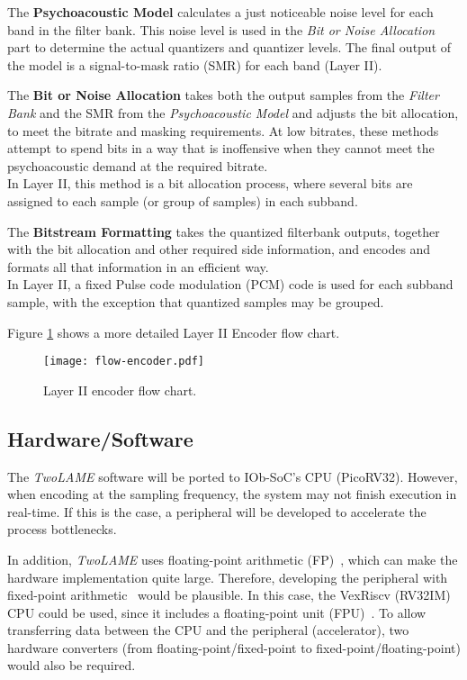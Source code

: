 The \textbf{Psychoacoustic Model} calculates a just noticeable noise level for each band in the filter bank. This noise level is used in the \textit{Bit or Noise Allocation} part to determine the actual quantizers and quantizer levels. 
The final output of the model is a signal-to-mask ratio (SMR) for each band (Layer II).

The \textbf{Bit or Noise Allocation} takes both the output samples from the \textit{Filter Bank} and the SMR from the \textit{Psychoacoustic Model} and adjusts the bit allocation, to meet the bitrate and masking requirements. At low bitrates, these methods attempt to spend bits in a way that is inoffensive when they cannot meet the psychoacoustic demand at the required bitrate.\\
In Layer II, this method is a bit allocation process, where several bits are assigned to each sample (or group of samples) in each subband.

The \textbf{Bitstream Formatting} takes the quantized filterbank outputs, together with the bit allocation and other required side information, and encodes and formats all that information in an efficient way.\\
In Layer II, a fixed Pulse code modulation (PCM) code is used for each subband sample, with the exception that quantized samples may be grouped.

Figure \ref{fig:flow-encoder} shows a more detailed Layer II Encoder flow chart.

\begin{figure}[H]
\centerline{\texttt{[image: flow-encoder.pdf]}}
\caption{Layer II encoder flow chart.}
\label{fig:flow-encoder}
\end{figure}

\subsection{Hardware/Software}

The \textit{TwoLAME} software will be ported to IOb-SoC's CPU (PicoRV32). However, when encoding at the sampling frequency, the system may not finish execution in real-time. If this is the case, a peripheral will be developed to accelerate the process bottlenecks.

In addition, \textit{TwoLAME} uses floating-point arithmetic (FP)~\cite{floatingpoint}, which can make the hardware implementation quite large. Therefore, developing the peripheral with fixed-point arithmetic~\cite{fixedpoint} would be plausible.
In this case, the VexRiscv (RV32IM) CPU could be used, since it includes a floating-point unit (FPU)~\cite{fpu}. To allow transferring data between the CPU and the peripheral (accelerator), two hardware converters (from floating-point/fixed-point to fixed-point/floating-point) would also be required.